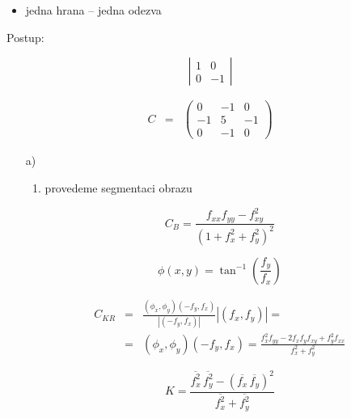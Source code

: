 \begin{enumerate}
\begin{itemize} 
\item jedna hrana -- jedna odezva
\end{itemize}

Postup:

\begin{enumerate} 
$$\left|\begin{array}{cc}1&0\\0&-1\end{array}\right|$$
\end{enumerate}

\end{enumerate}





\begin{eqnarray}
C&=&\left(\begin{array}{ccc}0&-1&0\\-1&5&-1\\0&-1&0\end{array}\right)
\end{eqnarray}





\begin{itemize}
\item[a)]
\begin{enumerate}
\item provedeme segmentaci obrazu
\end{enumerate}

\begin{equation}
C_B=\frac{f_{xx}f_{yy}-f_{xy}^2}{(1+f_x^2+f_y^2)^2}
\end{equation}


\begin{equation}
\phi(x,y)=\tan^{-1}\left(\frac{f_y}{f_x}\right)
\end{equation}


\begin{eqnarray}
C_{KR}&=&\frac{(\phi_x,\phi_y)(-f_y,f_x)}{\left|(-f_y,f_x)\right|}\left|(f_x,f_y)\right|=\nonumber\\
&=&(\phi_x,\phi_y)(-f_y,f_x)=\frac{f^2_xf_{yy}-2f_xf_yf_{xy}+f_y^2f_{xx}}{f_x^2+f_y^2}
\end{eqnarray}



\begin{equation}
K=\frac{\overline{f^2_x}\,\overline{f^2_y}-(\overline{f_x}\,\overline{f_y})^2}{\overline{f^2_x}+\overline{f^2_y}}
\end{equation}

\end{itemize}


